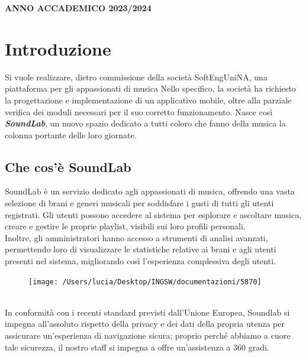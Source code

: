 \documentclass{article}
\begin{document}
	\vspace{0.5cm}
	
	\begin{center}
		\textbf{ANNO ACCADEMICO 2023/2024}
	\end{center}
	

	\renewcommand{\contentsname}{Indice} %
	\tableofcontents %
	
	\clearpage
	
	\section{Introduzione}
	Si vuole realizzare, dietro commissione della società SoftEngUniNA, una piattaforma per gli appassionati di musica
	Nello specifico, la società ha richiesto la progettazione e implementazione di un applicativo mobile, oltre alla parziale verifica dei moduli necessari per il suo corretto funzionamento.
	Nasce così \textbf{\textit{\textcolor{dark_purple}{SoundLab}}}, un nuovo spazio dedicato a tutti coloro che fanno della musica la colonna portante delle loro giornate.
		\subsection{Che cos'è SoundLab}
		SoundLab è un servizio dedicato agli appassionati di musica, offrendo una vasta selezione di brani e generi musicali per soddisfare i gusti di tutti gli utenti registrati. Gli utenti possono accedere al sistema per esplorare e ascoltare musica, creare e gestire le proprie playlist, visibili sui loro profili personali. \\Inoltre, gli amministratori hanno accesso a strumenti di analisi avanzati, permettendo loro di visualizzare le statistiche relative ai brani e agli utenti presenti nel sistema, migliorando così l'esperienza complessiva degli utenti.
		\\
		\begin{figure}[h]
			\centering
			\texttt{[image: /Users/lucia/Desktop/INGSW/documentazioni/5870]}
			\label{fig:first_pic}
		\end{figure}
		\\
		In conformità con i recenti standard previsti dall’Unione Europea, Soundlab si impegna all’assoluto rispetto della privacy e dei dati della propria utenza per assicurare un’esperienza di navigazione sicura; proprio perché abbiamo a cuore tale sicurezza, il nostro staff si impegna a offre un’assistenza a 360 gradi.
\end{document}
